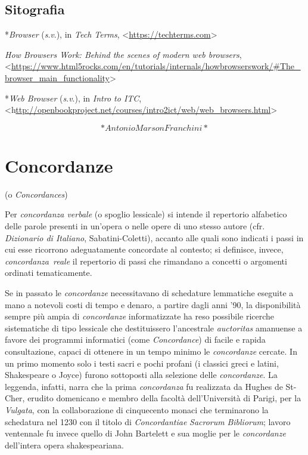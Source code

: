 \documentclass[
  b5paper,
  twoside,
  11pt,
  chapterprefix=false,
  bibliography=totocnumbered,
  parskip=0]{scrbook}
\begin{document}
\hypertarget{sitografia-3}{%
\section*{Sitografia}\label{sitografia-3}}

*\emph{Browser} (\emph{s}.\emph{v}.), in \emph{Tech Terms},
\textless{}{\href{https://techterms.com/}{https://techterms.com}\textgreater{}}

\emph{How Browsers Work: Behind the scenes of modern web browsers},
\textless{}{\url{https://www.html5rocks.com/en/tutorials/internals/howbrowserswork/\#The_browser_main_functionality}\textgreater{}}

*\emph{Web Browser} (\emph{s}.\emph{v}.), in \emph{Intro to ITC},
\textless{}{h\href{http://openbookproject.net/courses/intro2ict/web/web_browsers.html}{ttp://openbookproject.net/courses/intro2ict/web/web\_browsers.html}\textgreater{}}

\[*Antonio Marson Franchini*\]

\hypertarget{concordanze}{%
\chapter{Concordanze}\label{concordanze}}

(o \emph{Concordances})

Per \emph{concordanza verbale} (o spoglio lessicale) si intende il repertorio
alfabetico delle parole presenti in un'opera o nelle opere di uno stesso
autore (cfr. \emph{Dizionario di Italiano}, Sabatini-Coletti), accanto alle
quali sono indicati i passi in cui esse ricorrono adeguatamente
concordate al contesto; si definisce, invece, \emph{concordanza~reale} il
repertorio di passi che rimandano a concetti o argomenti ordinati
tematicamente.

Se in passato le \emph{concordanze} necessitavano di schedature lemmatiche
eseguite a mano a notevoli costi di tempo e denaro, a partire dagli anni
'90, la disponibilità sempre più ampia di \emph{concordanze} informatizzate
ha reso possibile ricerche sistematiche di tipo lessicale che
destituissero l'ancestrale \emph{auctoritas} amanuense a favore dei programmi
informatici (come \emph{Concordance}) di facile e rapida consultazione,
capaci di ottenere in un tempo minimo le \emph{concordanze} cercate. In un
primo momento solo i testi sacri e pochi profani (i classici greci e
latini, Shakespeare o Joyce) furono sottoposti alla selezione delle
\emph{concordanze}. La leggenda, infatti, narra che la prima \emph{concordanza} fu
realizzata da Hughes de St-Cher, erudito domenicano e membro della
facoltà dell'Università di Parigi, per la \emph{Vulgata}, con la
collaborazione di cinquecento monaci che terminarono la schedatura nel
1230 con il titolo di \emph{Concordantiae} \emph{Sacrorum} \emph{Bibliorum}; lavoro
ventennale fu invece quello di John Bartelett e sua moglie per le
\emph{concordanze} dell'intera opera shakespeariana.
\end{document}
